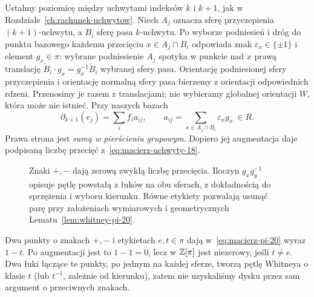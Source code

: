 Ustalmy poziomicę między uchwytami indeksów $k$ i $k+1$,
jak w Rozdziale~\ref{ch:rachunek-uchwytow}. Niech $A_j$
oznacza sferę przyczepienia $(k+1)$-uchwytu, a $B_i$
sferę pasa $k$-uchwytu. Po wyborze podniesień i dróg
do punktu bazowego każdemu przecięciu $x\in A_j\cap B_i$
odpowiada znak $\varepsilon_x\in\{\pm1\}$ i element
$g_x\in\pi$: wybrane podniesienie $A_j$ spotyka w punkcie
nad $x$ prawą translację $\widetilde B_i\cdot g_x
=g_x^{-1}\widetilde B_i$ wybranej sfery pasa.
Orientację podniesionej sfery przyczepienia i orientację normalną
sfery pasa bierzemy z orientacji odpowiednich rdzeni.
Przenosimy je razem z translacjami; nie wybieramy globalnej
orientacji $W$, która może nie istnieć.
Przy naszych bazach
\begin{equation}\label{eq:macierz-pi-20}
 \partial_{k+1}(e_j)=\sum_i f_i a_{ij},
 \qquad a_{ij}=\sum_{x\in A_j\cap B_i}\varepsilon_x g_x
 \ \in R.
\end{equation}
Prawa strona jest \emph{sumą w pierścieniu grupowym}.
Dopiero jej augmentacja daje podpisaną liczbę przecięć
z~\eqref{eq:macierz-uchwyty-18}.

\begin{figure}[htbp]
\centering
{}
\caption{Znaki $+,-$ dają zerową zwykłą liczbę przecięcia.
Iloczyn $g_xg_y^{-1}$ opisuje pętlę powstałą z łuków na obu
sferach, z dokładnością do sprzężenia i wyboru kierunku.
Równe etykiety pozwalają usunąć parę przy założeniach
wymiarowych i geometrycznych Lematu~\ref{lem:whitney-pi-20}.}
\label{fig:etykiety-whitneya-20}
\end{figure}

\begin{przyklad}
Dwa punkty o znakach $+,-$ i etykietach $e,t\in\pi$
dają w~\eqref{eq:macierz-pi-20} wyraz $1-t$.
Po augmentacji jest to $1-1=0$, lecz w $\mathbb{Z}[\pi]$
jest niezerowy, jeśli $t\ne e$. Dwa łuki łączące te punkty,
po jednym na każdej sferze, tworzą pętlę Whitneya
o klasie $t$ (lub $t^{-1}$, zależnie
od kierunku), zatem nie uzyskaliśmy dysku przez sam
argument o przeciwnych znakach.
\end{przyklad}

